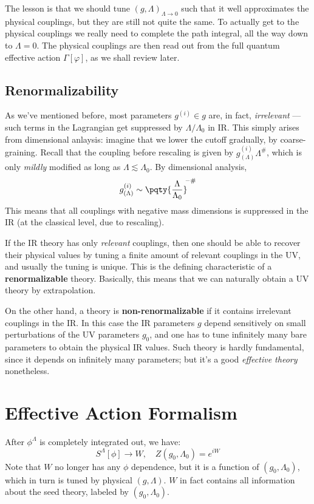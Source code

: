 \documentclass[a4paper
	,10pt
]{article}
\begin{document}
	The lesson is that we should tune $(g,\Lambda)_{\Lambda\to 0}$ such that it well approximates the physical couplings, but they are still not quite the same. To actually get to the physical couplings we really need to complete the path integral, all the way down to $\Lambda = 0$. The physical couplings are then read out from the full quantum effective action $\Gamma[\varphi]$, as we shall review later. 
	
\subsection{Renormalizability}
	As we've mentioned before, most parameters $g^{(i)} \in g$ are, in fact, \emph{irrelevant} --- such terms in the Lagrangian get suppressed by $\Lambda/\Lambda_0$ in IR. This simply arises from dimensional anlaysis: imagine that we lower the cutoff gradually, by coarse-graining. Recall that the coupling before rescaling is given by $g^{(i)}_{(\Lambda)} \Lambda^\#$, which is only \textit{mildly} modified as long as $\Lambda\lesssim\Lambda_0$. By dimensional analysis,
	\begin{equation}
		g^{(i)}_{(\Lambda)}
		\sim \pqty{\frac{\Lambda}{\Lambda_0}}^{\!\!-\#}
	\end{equation}
	This means that all couplings with negative mass dimensions is suppressed in the IR (at the classical level, due to rescaling). 
	
	
	If the IR theory has only \emph{relevant} couplings, then one should be
	able to recover their physical values by tuning a finite amount of
	relevant couplings in the UV, and usually the tuning is unique. This is
	the defining characteristic of a \textbf{renormalizable} theory.
	Basically, this means that we can naturally obtain a UV theory by
	extrapolation.
	
	On the other hand, a theory is \textbf{non-renormalizable} if it
	contains irrelevant couplings in the IR. In this case the IR parameters
	$g$ depend sensitively on small perturbations of the UV parameters
	$g_0$, and one has to tune infinitely many bare parameters to obtain
	the physical IR values. Such theory is hardly fundamental, since
	it depends on infinitely many parameters; but it's a good
	\emph{effective theory} nonetheless.
	
\section{Effective Action Formalism}
	After $\phi^\Lambda$ is completely integrated out, we
	have:
	\begin{equation}
	  S^\Lambda[\phi] \to W,\quad
	  Z(g_0,\Lambda_0) = e^{iW}
	\end{equation}
	Note that $W$ no longer has any $\phi$ dependence, but it is a
	function of $(g_0,\Lambda_0)$, which in turn is tuned by physical
	$(g,\Lambda)$. $W$ in fact contains all information about the seed
	theory, labeled by $(g_0,\Lambda_0)$. 
	
\end{document}

